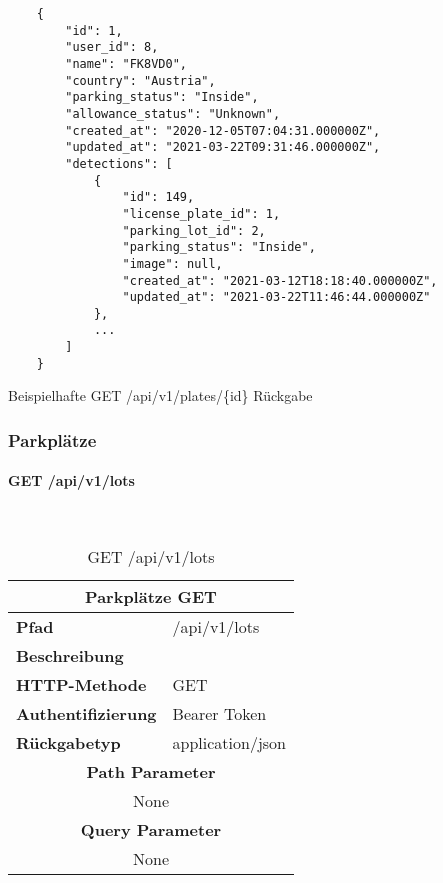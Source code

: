 \begin{listing}[H]
  \begin{verbatim}
    {
        "id": 1,
        "user_id": 8,
        "name": "FK8VD0",
        "country": "Austria",
        "parking_status": "Inside",
        "allowance_status": "Unknown",
        "created_at": "2020-12-05T07:04:31.000000Z",
        "updated_at": "2021-03-22T09:31:46.000000Z",
        "detections": [
            {
                "id": 149,
                "license_plate_id": 1,
                "parking_lot_id": 2,
                "parking_status": "Inside",
                "image": null,
                "created_at": "2021-03-12T18:18:40.000000Z",
                "updated_at": "2021-03-22T11:46:44.000000Z"
            },
            ...
        ]
    }
  \end{verbatim}
  \caption{Beispielhafte GET /api/v1/plates/\{id\} Rückgabe}
\end{listing}

\subsubsection{Parkplätze}
\paragraph{GET /api/v1/lots}\mbox{}\\

\begin{table}[H]
  \centering
  \begin{tabular}{|l|l|}
  \hline
  \multicolumn{2}{|c|}{\textbf{Parkplätze GET}} \\ \hline
  \textbf{Pfad}                & /api/v1/lots  \\ \hline
  \textbf{Beschreibung}        &                     \\ \hline
  \textbf{HTTP-Methode}        & GET                 \\ \hline
  \textbf{Authentifizierung}   & Bearer Token        \\ \hline
  \textbf{Rückgabetyp}         & application/json    \\ \hline
  \multicolumn{2}{|c|}{\textbf{Path Parameter}}                      \\ \hline
  \multicolumn{2}{|c|}{None}          \\ \hline
  \multicolumn{2}{|c|}{\textbf{Query Parameter}}                      \\ \hline
  \multicolumn{2}{|c|}{None}          \\ \hline
  \end{tabular}
  \caption{GET /api/v1/lots}
\end{table}

